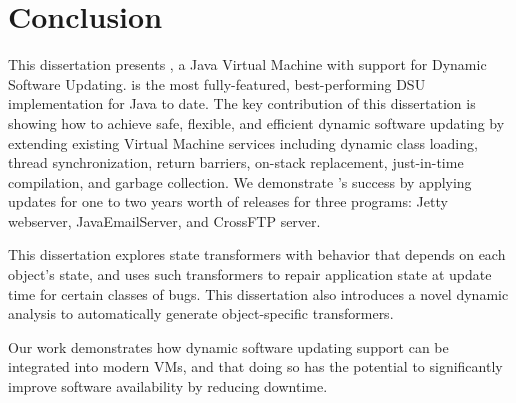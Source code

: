 
\chapter{Conclusion\label{chap:conc}}

This dissertation presents \JV, a Java Virtual Machine with support for
Dynamic Software Updating. \JV is the most fully-featured, best-performing DSU
implementation for Java to date. The key contribution of this dissertation is
showing how to achieve safe, flexible, and efficient dynamic software
updating by extending existing Virtual Machine services including dynamic
class loading, thread synchronization, return barriers, on-stack
replacement, just-in-time compilation, and garbage collection. We
demonstrate \JV's success by applying updates for one to two years worth of
releases for three programs: Jetty webserver, JavaEmailServer, and CrossFTP
server.

This dissertation explores state transformers with behavior that depends on
each object's state, and uses such transformers to repair application state
at update time for certain classes of bugs. This dissertation also
introduces a novel dynamic analysis to automatically generate
object-specific transformers.

Our work demonstrates how dynamic software updating support can be
integrated into modern VMs, and that doing so has the potential to
significantly improve software availability by reducing downtime.
